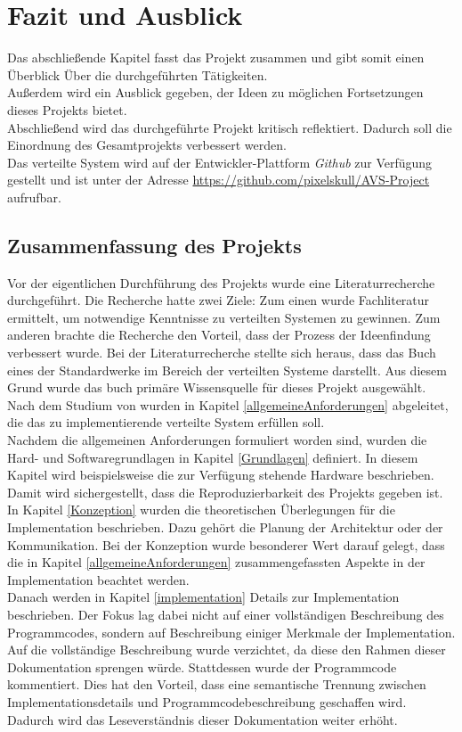 \chapter{Fazit und Ausblick}
Das abschließende Kapitel fasst das Projekt zusammen und gibt somit einen Überblick Über die durchgeführten Tätigkeiten.\\
 Außerdem wird ein Ausblick gegeben, der Ideen zu möglichen Fortsetzungen dieses Projekts bietet. \\
 Abschließend wird das durchgeführte Projekt kritisch reflektiert. Dadurch soll die Einordnung des Gesamtprojekts verbessert werden.\\
 
Das verteilte System wird auf der Entwickler-Plattform \emph{Github} zur Verfügung gestellt und ist unter der Adresse \url{https://github.com/pixelskull/AVS-Project} aufrufbar.

\section{Zusammenfassung des Projekts}
Vor der eigentlichen Durchführung des Projekts wurde eine Literaturrecherche durchgeführt. Die Recherche hatte zwei Ziele: Zum einen wurde Fachliteratur ermittelt, um notwendige Kenntnisse zu verteilten Systemen zu gewinnen. Zum anderen brachte die Recherche den Vorteil, dass der Prozess der Ideenfindung verbessert wurde. Bei der Literaturrecherche stellte sich heraus, dass das Buch \citep{tanenbaum} eines der Standardwerke im Bereich der verteilten Systeme darstellt. Aus diesem Grund wurde das buch primäre Wissensquelle für dieses Projekt ausgewählt. \\
Nach dem Studium von \citep{tanenbaum} wurden in Kapitel \ref{allgemeineAnforderungen} abgeleitet, die das zu implementierende verteilte System erfüllen soll. \\
Nachdem die allgemeinen Anforderungen formuliert worden sind, wurden die Hard- und Softwaregrundlagen in Kapitel \ref{Grundlagen} definiert. In diesem Kapitel wird beispielsweise die zur Verfügung stehende Hardware beschrieben. Damit wird sichergestellt, dass die Reproduzierbarkeit des Projekts gegeben ist. \\
In Kapitel \ref{Konzeption} wurden die theoretischen Überlegungen für die Implementation beschrieben. Dazu gehört die Planung der Architektur oder der Kommunikation. Bei der Konzeption wurde besonderer Wert darauf gelegt, dass die in Kapitel \ref{allgemeineAnforderungen} zusammengefassten Aspekte in der Implementation beachtet werden. \\
Danach werden in Kapitel \ref{implementation} Details zur Implementation beschrieben. Der Fokus lag dabei nicht auf einer vollständigen Beschreibung des Programmcodes, sondern auf Beschreibung einiger Merkmale der Implementation. Auf die vollständige Beschreibung wurde verzichtet, da diese den Rahmen dieser Dokumentation sprengen würde. Stattdessen wurde der Programmcode kommentiert. Dies hat den Vorteil, dass eine semantische Trennung zwischen Implementationsdetails und Programmcodebeschreibung geschaffen wird. Dadurch wird das Leseverständnis dieser Dokumentation weiter erhöht. 

